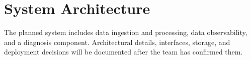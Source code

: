 \section{System Architecture}
\label{sec:architecture}
The planned system includes data ingestion and processing, data observability,
and a diagnosis component. Architectural details, interfaces, storage, and
deployment decisions will be documented after the team has confirmed them.
